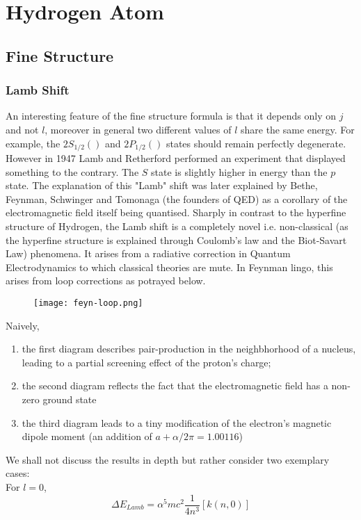 \chapter{Hydrogen Atom}
\section{Fine Structure}
\subsection{Lamb Shift}
An interesting feature of the fine structure formula is that it depends only on $j$ and not $l$, moreover in general two different values of $l$ share the same energy. For example, the $2S_{1/2} ()$ and $2P_{1/2} ()$ states should remain perfectly degenerate. However in 1947 Lamb and Retherford performed an experiment that displayed something to the contrary. The $S$ state is slightly higher in energy than the $p$ state. The explanation of this "Lamb" shift was later explained by Bethe, Feynman, Schwinger and Tomonaga (the founders of QED) as a corollary of the electromagnetic field itself being quantised.  Sharply in contrast to the hyperfine structure of Hydrogen, the Lamb shift is a completely novel i.e. non-classical (as the hyperfine structure is explained through Coulomb's law and the Biot-Savart Law) phenomena. It arises from a radiative correction in Quantum Electrodynamics to which classical theories are mute. In Feynman lingo, this arises from loop corrections as potrayed below.
\begin{figure}[h]
	\centering
	\texttt{[image: feyn-loop.png]}
\end{figure}
Naively,
\begin{enumerate}
\item the first diagram describes pair-production in the neighbhorhood of a nucleus, leading to a partial screening effect of the proton's charge;
\item the second diagram reflects the fact that the electromagnetic field has a non-zero ground state
\item the third diagram leads to a tiny modification of the electron's magnetic dipole moment (an addition of $a + \alpha/2\pi = 1.00116$)
\end{enumerate}
We shall not discuss the results in depth but rather consider two exemplary cases:\\
For $ l = 0$,
\begin{equation}
	\Delta E_{Lamb} = \alpha^{5}mc^{2}\frac{1}{4n^{3}}\left[k(n,0)\right]
\end{equation}
